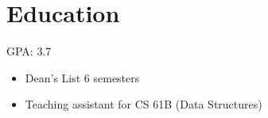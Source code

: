 
\section{Education}



GPA: 3.7


\begin{itemize}

  \item Dean's List 6 semesters

  \item Teaching assistant for CS 61B (Data Structures)

\end{itemize}




